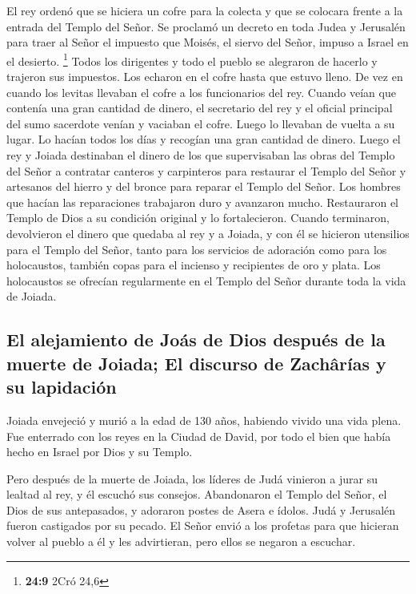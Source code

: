 El rey ordenó que se hiciera un cofre para la colecta y
que se colocara frente a la entrada del Templo del Señor. 
Se proclamó un decreto en toda Judea y Jerusalén para traer al Señor el
impuesto que Moisés, el siervo del Señor, impuso a Israel en el
desierto. \footnote{\textbf{24:9} 2Cró 24,6}  Todos los
dirigentes y todo el pueblo se alegraron de hacerlo y trajeron sus
impuestos. Los echaron en el cofre hasta que estuvo lleno.
 De vez en cuando los levitas llevaban el cofre a los
funcionarios del rey. Cuando veían que contenía una gran cantidad de
dinero, el secretario del rey y el oficial principal del sumo sacerdote
venían y vaciaban el cofre. Luego lo llevaban de vuelta a su lugar. Lo
hacían todos los días y recogían una gran cantidad de dinero.
 Luego el rey y Joiada destinaban el dinero de los que
supervisaban las obras del Templo del Señor a contratar canteros y
carpinteros para restaurar el Templo del Señor y artesanos del hierro y
del bronce para reparar el Templo del Señor.  Los hombres
que hacían las reparaciones trabajaron duro y avanzaron mucho.
Restauraron el Templo de Dios a su condición original y lo
fortalecieron.  Cuando terminaron, devolvieron el dinero
que quedaba al rey y a Joiada, y con él se hicieron utensilios para el
Templo del Señor, tanto para los servicios de adoración como para los
holocaustos, también copas para el incienso y recipientes de oro y
plata. Los holocaustos se ofrecían regularmente en el Templo del Señor
durante toda la vida de Joiada.

\hypertarget{el-alejamiento-de-jouxe1s-de-dios-despuuxe9s-de-la-muerte-de-joiada-el-discurso-de-zachuxe2ruxedas-y-su-lapidaciuxf3n}{%
\subsection{El alejamiento de Joás de Dios después de la muerte de
Joiada; El discurso de Zachârías y su
lapidación}\label{el-alejamiento-de-jouxe1s-de-dios-despuuxe9s-de-la-muerte-de-joiada-el-discurso-de-zachuxe2ruxedas-y-su-lapidaciuxf3n}}

 Joiada envejeció y murió a la edad de 130 años, habiendo
vivido una vida plena.  Fue enterrado con los reyes en la
Ciudad de David, por todo el bien que había hecho en Israel por Dios y
su Templo.

 Pero después de la muerte de Joiada, los líderes de Judá
vinieron a jurar su lealtad al rey, y él escuchó sus consejos.
 Abandonaron el Templo del Señor, el Dios de sus
antepasados, y adoraron postes de Asera e ídolos. Judá y Jerusalén
fueron castigados por su pecado.  El Señor envió a los
profetas para que hicieran volver al pueblo a él y les advirtieran, pero
ellos se negaron a escuchar.

